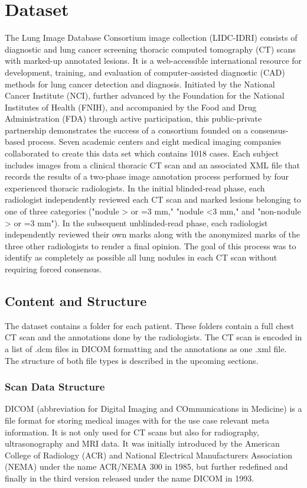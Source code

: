 \documentclass[../Thesis.tex]{subfiles}
\begin{document}
\chapter{Dataset}\label{chap:02data}
The Lung Image Database Consortium image collection (LIDC-IDRI) consists of diagnostic and lung cancer screening thoracic computed tomography (CT) scans with marked-up annotated lesions. It is a web-accessible international resource for development, training, and evaluation of computer-assisted diagnostic (CAD) methods for lung cancer detection and diagnosis. Initiated by the National Cancer Institute (NCI), further advanced by the Foundation for the National Institutes of Health (FNIH), and accompanied by the Food and Drug Administration (FDA) through active participation, this public-private partnership demonstrates the success of a consortium founded on a consensus-based process.
Seven academic centers and eight medical imaging companies collaborated to create this data set which contains 1018 cases.  Each subject includes images from a clinical thoracic CT scan and an associated XML file that records the results of a two-phase image annotation process performed by four experienced thoracic radiologists. In the initial blinded-read phase, each radiologist independently reviewed each CT scan and marked lesions belonging to one of three categories ("nodule > or =3 mm," "nodule <3 mm," and "non-nodule > or =3 mm"). In the subsequent unblinded-read phase, each radiologist independently reviewed their own marks along with the anonymized marks of the three other radiologists to render a final opinion. The goal of this process was to identify as completely as possible all lung nodules in each CT scan without requiring forced consensus. \cite{armato2011lung}

\section{Content and Structure}
The dataset contains a folder for each patient. These folders contain a full chest CT scan and the annotations done by the radiologists. The CT scan is encoded in a list of .dcm files in DICOM formatting and the annotations as one .xml file. The structure of both file types is described in the upcoming sections.

\subsection{Scan Data Structure}
DICOM (abbreviation for Digital Imaging and COmmunications in Medicine) is a file format for storing medical images with for the use case relevant meta information. It is not only used for CT scans but also for radiography, ultrasonography and MRI data. It was initially introduced by the American College of Radiology (ACR) and National Electrical Manufacturers Association (NEMA) under the name ACR/NEMA 300 in 1985, but further redefined and finally in the third version released under the name DICOM in 1993\cite{pianykh2008}.
\end{document}
